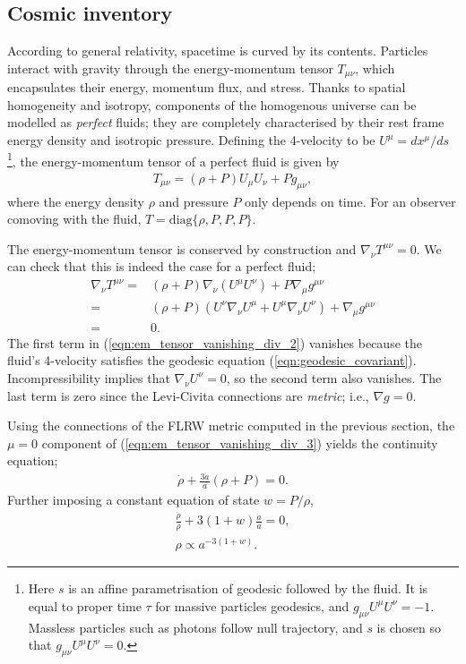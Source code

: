 \subsection{Cosmic inventory}

According to general relativity, spacetime is curved by its contents. Particles interact with gravity through the energy-momentum tensor $T_{\mu\nu}$, which encapsulates their energy, momentum flux, and stress. Thanks to spatial homogeneity and isotropy, components of the homogenous universe can be modelled as \textit{perfect} fluids; they are completely characterised by their rest frame energy density and isotropic pressure. Defining the 4-velocity to be $U^\mu = dx^\mu / ds$ \footnote{Here $s$ is an affine parametrisation of geodesic followed by the fluid. It is equal to proper time $\tau$ for massive particles geodesics, and $g_{\mu\nu}U^\mu U^\nu = -1$. Massless particles such as photons follow null trajectory, and $s$ is chosen so that $g_{\mu\nu}U^\mu U^\nu = 0$.}, the energy-momentum tensor of a perfect fluid is given by
\begin{align}
	T_{\mu\nu} = (\rho + P) U_\mu U_\nu + P g_{\mu\nu}, \label{eqn:em_tensor_perfect_fluid}
\end{align}
where the energy density $\rho$ and pressure $P$ only depends on time. For an observer comoving with the fluid, $T = \text{diag}\{\rho,P,P,P\}$.

The energy-momentum tensor is conserved by construction and $\nabla_\nu T^{\mu\nu} = 0$. We can check that this is indeed the case for a perfect fluid;
\begin{align}
	\nabla_\nu T^{\mu\nu} =& (\rho + P) \nabla_\nu \left( U^\mu U^\nu \right) + P \nabla_\mu g^{\mu\nu} \label{eqn:em_tensor_vanishing_div_1} \\
	=& (\rho + P) \left(  U^\nu \nabla_\nu U^\mu + U^\mu \nabla_\nu U^\nu \right) + \nabla_\mu g^{\mu\nu} \label{eqn:em_tensor_vanishing_div_2}\\
	=& 0. \label{eqn:em_tensor_vanishing_div_3}
\end{align}
The first term in (\ref{eqn:em_tensor_vanishing_div_2}) vanishes because the fluid's 4-velocity satisfies the geodesic equation (\ref{eqn:geodesic_covariant}). Incompressibility implies that $\nabla_\nu U^\nu = 0$, so the second term also vanishes. The last term is zero since the Levi-Civita connections are \textit{metric}; i.e., $\nabla g = 0$.

Using the connections of the FLRW metric computed in the previous section, the $\mu=0$ component of (\ref{eqn:em_tensor_vanishing_div_3}) yields the continuity equation;
\begin{align}
	\dot{\rho} + \frac{3\dot{a}}{a} \left( \rho + P \right) = 0. \label{eqn:continuity}
\end{align}
Further imposing a constant equation of state $w = P / \rho$, 
\begin{align}
	\frac{\dot{\rho}}{\rho} + 3(1+w) \frac{\dot{a}}{a} = 0, \\
	\rho \propto a^{-3(1+w)}. \label{eqn:energy_density_and_scale_factor}
\end{align}

